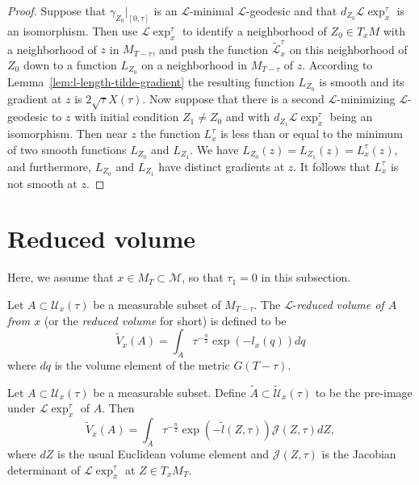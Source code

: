 \begin{proof}
\sketch
Suppose that
$\gamma_{Z_0}|_{[0,\tau]}$ is an ${\mathcal L}$-minimal ${\mathcal L}$-geodesic
and that $d_{Z_0}{\mathcal L}\exp_x^\tau$ is an isomorphism. Then use
${\mathcal L}\exp_x^{\tau}$ to identify a neighborhood of $Z_0\in T_xM$
with a neighborhood of $z$ in $M_{T-\tau}$, and push  the function
$\widetilde{\mathcal L}^\tau_x$ on this neighborhood of $Z_0$ down to a
function $L_{Z_0}$ on a neighborhood in $M_{T-\tau}$ of $z$. According to
Lemma~\ref{lem:l-length-tilde-gradient} the resulting function $L_{Z_0}$ is smooth and its gradient
at $z$ is $2\sqrt{\tau}X(\tau)$. Now suppose that there is a second ${\mathcal
L}$-minimizing ${\mathcal L}$-geodesic to $z$ with initial condition
$Z_1\not=Z_0$ and with $d_{Z_1}{\mathcal L}\exp_x^\tau$ being an
isomorphism. Then near $z$ the function $L_x^{\tau}$ is less than or equal to
the minimum of two smooth functions $L_{Z_0}$ and $L_{Z_1}$. We have
$L_{Z_0}(z)=L_{Z_1}(z)=L_x^\tau(z)$,  and furthermore, $L_{Z_0}$ and $L_{Z_1}$
have distinct gradients at $z$. It follows that $L_x^{\tau}$ is not smooth at
$z$.
\end{proof}


\section{Reduced volume}

Here, we  assume that $x\in M_T\subset {\mathcal M}$, so that
$\tau_1=0$ in this subsection.


\begin{definition}\label{def:reduced-volume}
\label{redvol}

Let $A\subset {\mathcal U}_x(\tau)$ be a  measurable subset of
$M_{T-\tau}$. The $\mathcal{L}$-{\em reduced volume of $A$ from $x$}
(or the {\em reduced volume} for short) is
defined to be
$$\widetilde V_x(A) = \int_{A} \tau^{-\frac{n}{2}}\exp(-l_x(q))dq$$ where $dq$ is the volume
element of the metric $G(T-\tau)$.
\end{definition}




\begin{lemma}\label{lem:reduced-volume-pullback}
\label{redvoltilde}

Let $A\subset {\mathcal U}_x(\tau)$ be a  measurable subset. Define
$\widetilde A\subset \widetilde{\mathcal U}_x(\tau)$ to be the
pre-image under ${\mathcal L}\exp_x^{\tau}$ of $A$. Then
$$\widetilde V_x(A)=\int_{\widetilde A}\tau^{-\frac{n}{2}}\exp(-\tilde l(Z, \tau)){\mathcal J}(Z,\tau)dZ,$$ where $dZ$ is the usual
Euclidean volume element and ${\mathcal J}(Z,\tau)$ is the Jacobian determinant
of ${\mathcal L}\exp_x^{\tau}$ at $Z\in T_xM_T$.
\end{lemma}

